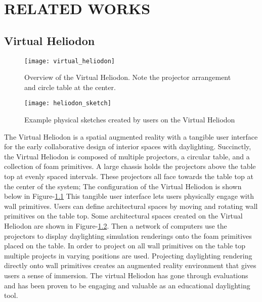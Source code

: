 \chapter{RELATED WORKS} \label{sec:introduction}

\section{Virtual Heliodon}

	\begin{figure}[h]
	\centering
	\texttt{[image: virtual\_heliodon]}
	\label{fig:virtual_heliodon}
	\caption{Overview of the Virtual Heliodon. Note the projector arrangement and circle table at the center.}
	\end{figure}

	\begin{figure}[h]
	\centering
	\texttt{[image: heliodon\_sketch]}
	\label{fig:heliodon_sketch}
	\caption{Example physical sketches created by users on the Virtual Heliodon}
	\end{figure}

	The Virtual Heliodon is a spatial augmented reality with a tangible user interface for the early collaborative design of interior spaces with daylighting\cite{sheng2009virtual, cutler2009inferring,nasman2013physical,nasman2013evaluation,cutler2010interpreting}. 
	Succinctly, the Virtual Heliodon is composed of multiple projectors, a circular table, and a collection of foam primitives.  
	A large chassis holds the projectors above the table top at evenly spaced intervals. 
	These projectors all face towards the table top at the center of the system;
	The configuration of the Virtual Heliodon is shown below in Figure-\ref{fig:virtual_heliodon}
	This tangible user interface lets users physically engage with wall primitives. 
	Users can define architectural spaces by moving and rotating wall primitives on the table top.
	Some architectural spaces created on the Virtual Heliodon are shown in Figure-\ref{fig:heliodon_sketch}.
	Then a network of computers use the projectors to display daylighting simulation renderings onto the foam primitives placed on the table.
	In order to project on all wall primitives on the table top multiple projects in varying positions are used.
	Projecting daylighting rendering directly onto wall primitives creates an augmented reality environment that gives users a sense of immersion\cite{nasman2013evaluation}.
	The virtual Heliodon has gone through evaluations and has been proven to be engaging and valuable as an educational daylighting tool\cite{nasman2013evaluation}.


